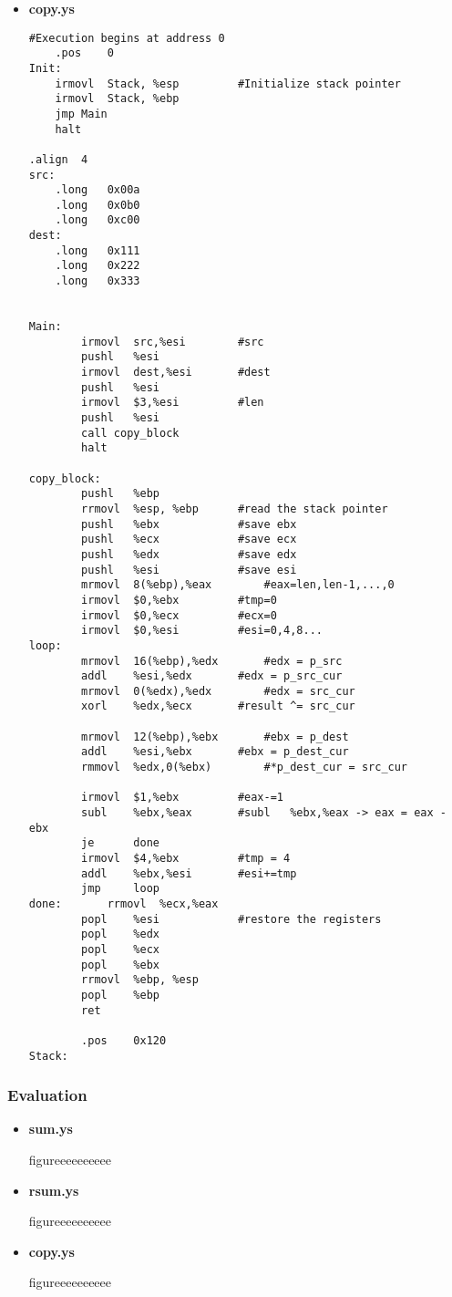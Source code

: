 \documentclass{article}
\begin{document}
\begin{itemize}
\begin{lstlisting}[caption={}]
		.pos	0x120
Stack:
 


\end{lstlisting}

\item \textbf{copy.ys}
  \begin{lstlisting}[caption={}]
#Execution begins at address 0
	.pos	0
Init:
	irmovl	Stack, %esp			#Initialize stack pointer
	irmovl	Stack, %ebp
	jmp	Main
	halt

.align	4
src:
	.long	0x00a
	.long	0x0b0
	.long	0xc00
dest:
	.long	0x111
	.long	0x222
	.long	0x333


Main:
		irmovl	src,%esi		#src
		pushl	%esi
		irmovl	dest,%esi		#dest
		pushl	%esi
		irmovl	$3,%esi			#len
		pushl	%esi
		call copy_block	
		halt

copy_block:
		pushl	%ebp
		rrmovl	%esp, %ebp		#read the stack pointer
		pushl	%ebx			#save ebx
		pushl	%ecx			#save ecx
		pushl	%edx			#save edx
		pushl	%esi			#save esi
		mrmovl	8(%ebp),%eax		#eax=len,len-1,...,0
		irmovl	$0,%ebx			#tmp=0
		irmovl	$0,%ecx			#ecx=0
		irmovl	$0,%esi			#esi=0,4,8...
loop:	
		mrmovl	16(%ebp),%edx		#edx = p_src
		addl	%esi,%edx		#edx = p_src_cur
		mrmovl	0(%edx),%edx		#edx = src_cur
		xorl	%edx,%ecx		#result ^= src_cur

		mrmovl	12(%ebp),%ebx		#ebx = p_dest
		addl	%esi,%ebx		#ebx = p_dest_cur
		rmmovl	%edx,0(%ebx)		#*p_dest_cur = src_cur

		irmovl  $1,%ebx			#eax-=1
		subl	%ebx,%eax		#subl	%ebx,%eax -> eax = eax - ebx
		je		done
		irmovl	$4,%ebx			#tmp = 4
		addl	%ebx,%esi		#esi+=tmp
		jmp		loop
done:		rrmovl	%ecx,%eax
		popl	%esi			#restore the registers
		popl	%edx
		popl 	%ecx
		popl	%ebx
		rrmovl	%ebp, %esp
		popl	%ebp
		ret

		.pos	0x120
Stack:

\end{lstlisting}
\end{itemize}


\subsubsection{Evaluation}


\begin{itemize}
\item \textbf{sum.ys}

figureeeeeeeeee
      
\item \textbf{rsum.ys}

figureeeeeeeeee

\item \textbf{copy.ys}

figureeeeeeeeee

\end{itemize}
\end{document}

